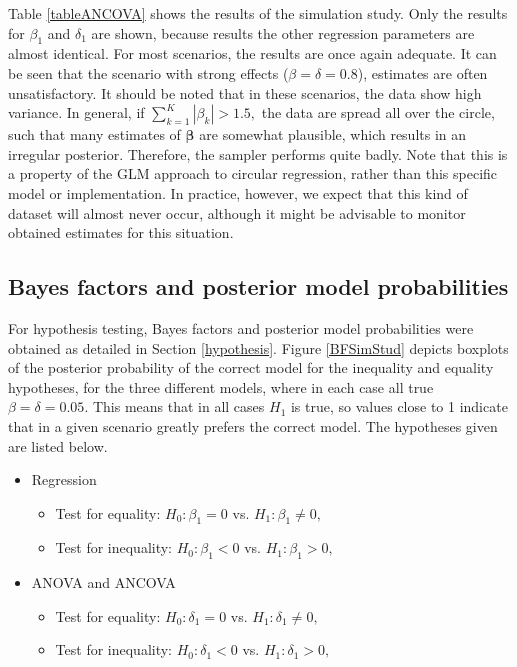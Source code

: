 \documentclass[11pt,a4paper]{article}\usepackage[]{graphicx}\usepackage[]{color}
\newcommand{\bbt}{\boldsymbol{\beta}}
\begin{document}
Table \ref{tableANCOVA} shows the results of the simulation study. Only the results for \( \beta_1 \) and \( \delta_1 \) are shown, because results the other regression parameters are almost identical. For most scenarios, the results are once again adequate. It can be seen that the scenario with strong effects (\( \beta = \delta = 0.8\)), estimates are often unsatisfactory. It should be noted that in these scenarios, the data show high variance. In general, if \( \sum_{k=1}^K | \beta_k | > 1.5, \) the data are spread all over the circle, such that many estimates of \( \bbt \) are somewhat plausible, which results in an irregular posterior. Therefore, the sampler performs quite badly. Note that this is a property of the GLM approach to circular regression, rather than this specific model or implementation. In practice, however, we expect that this kind of dataset will almost never occur, although it might be advisable to monitor obtained estimates for this situation.


\subsection{Bayes factors and posterior model probabilities}



For hypothesis testing, Bayes factors and posterior model probabilities were obtained as detailed in Section \ref{hypothesis}. Figure \ref{BFSimStud} depicts boxplots of the posterior probability of the correct model for the inequality and equality hypotheses, for the three different models, where in each case all true \( \beta = \delta = 0.05 \). This means that in all cases \( H_1 \) is true, so values close to 1 indicate that in a given scenario greatly prefers the correct model. The hypotheses given are listed below.

\begin{itemize}
\item Regression
\begin{itemize}
\item Test for equality:  \( H_0 : \beta_1 = 0 \) vs. \( H_1 : \beta_1 \neq 0,\)
\item Test for inequality:  \( H_0 : \beta_1 < 0 \) vs. \( H_1 : \beta_1 > 0,\)
\end{itemize}
\item ANOVA and ANCOVA
\begin{itemize}
\item Test for equality:  \( H_0 : \delta_1 = 0 \) vs. \( H_1 : \delta_1 \neq 0,\)
\item Test for inequality:  \( H_0 : \delta_1 < 0 \) vs. \( H_1 : \delta_1 > 0,\)
\end{itemize}
\end{itemize}
\end{document}
